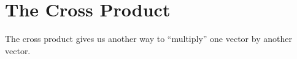 \newlecture

\setcounter{section}{3}
\def\coursetopicnumber{I}
\def\textbooksection{9.4} %
\def\topic{The Cross Product} %
\def\shorttopic{Cross product} %
\def\textbookname{Active Calculus} %
\def\textbooksectionurl{https://activecalculus.org/vector/S-9-4-Cross-Product.html} %
\def\handoutday{} %


\thispagestyle{plain}
\topstuff
\section{\topic{} \booklink{}}
\label{sec:cross-product}
The cross product gives us another way to ``multiply'' one vector by another vector.

